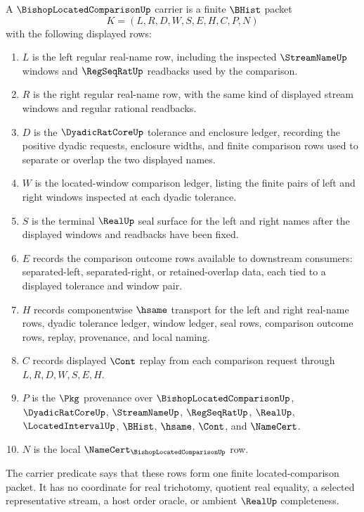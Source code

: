 \begin{definition}
\label{def:bishop-located-comparison-carrier}
A $\BishopLocatedComparisonUp$ carrier is a finite $\BHist$ packet
$$
K=(L,R,D,W,S,E,H,C,P,N)
$$
with the following displayed rows:
\begin{enumerate}
\item $L$ is the left regular real-name row, including the inspected $\StreamNameUp$ windows and $\RegSeqRatUp$ readbacks used by the comparison.
\item $R$ is the right regular real-name row, with the same kind of displayed stream windows and regular rational readbacks.
\item $D$ is the $\DyadicRatCoreUp$ tolerance and enclosure ledger, recording the positive dyadic requests, enclosure widths, and finite comparison rows used to separate or overlap the two displayed names.
\item $W$ is the located-window comparison ledger, listing the finite pairs of left and right windows inspected at each dyadic tolerance.
\item $S$ is the terminal $\RealUp$ seal surface for the left and right names after the displayed windows and readbacks have been fixed.
\item $E$ records the comparison outcome rows available to downstream consumers: separated-left, separated-right, or retained-overlap data, each tied to a displayed tolerance and window pair.
\item $H$ records componentwise $\hsame$ transport for the left and right real-name rows, dyadic tolerance ledger, window ledger, seal rows, comparison outcome rows, replay, provenance, and local naming.
\item $C$ records displayed $\Cont$ replay from each comparison request through $L,R,D,W,S,E,H$.
\item $P$ is the $\Pkg$ provenance over $\BishopLocatedComparisonUp$, $\DyadicRatCoreUp$, $\StreamNameUp$, $\RegSeqRatUp$, $\RealUp$, $\LocatedIntervalUp$, $\BHist$, $\hsame$, $\Cont$, and $\NameCert$.
\item $N$ is the local $\NameCert_{\BishopLocatedComparisonUp}$ row.
\end{enumerate}
The carrier predicate says that these rows form one finite located-comparison packet. It has no coordinate for real trichotomy, quotient real equality, a selected representative stream, a host order oracle, or ambient $\RealUp$ completeness.
\end{definition}


